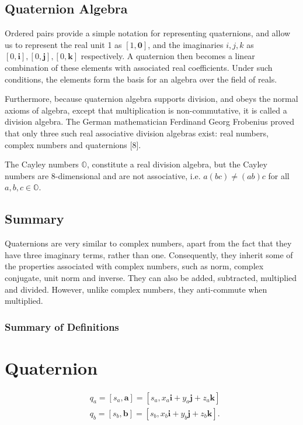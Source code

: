\documentclass[10pt]{article}
\begin{document}
\subsection{Quaternion Algebra}
Ordered pairs provide a simple notation for representing quaternions, and allow us to represent the real unit 1 as $[1, \mathbf{0}]$, and the imaginaries $i, j, k$ as $[0, \mathbf{i}],[0, \mathbf{j}],[0, \mathbf{k}]$ respectively. A quaternion then becomes a linear combination of these elements with associated real coefficients. Under such conditions, the elements form the basis for an algebra over the field of reals.

Furthermore, because quaternion algebra supports division, and obeys the normal axioms of algebra, except that multiplication is non-commutative, it is called a division algebra. The German mathematician Ferdinand Georg Frobenius proved that only three such real associative division algebras exist: real numbers, complex numbers and quaternions [8].

The Cayley numbers $\mathbb{O}$, constitute a real division algebra, but the Cayley numbers are 8-dimensional and are not associative, i.e. $a(b c) \neq(a b) c$ for all $a, b, c \in \mathbb{O}$.

\subsection{Summary}
Quaternions are very similar to complex numbers, apart from the fact that they have three imaginary terms, rather than one. Consequently, they inherit some of the properties associated with complex numbers, such as norm, complex conjugate, unit norm and inverse. They can also be added, subtracted, multiplied and divided. However, unlike complex numbers, they anti-commute when multiplied.

\subsubsection{Summary of Definitions}
\section{Quaternion}
$$
\begin{aligned}
& q_{a}=\left[s_{a}, \mathbf{a}\right]=\left[s_{a}, x_{a} \mathbf{i}+y_{a} \mathbf{j}+z_{a} \mathbf{k}\right] \\
& q_{b}=\left[s_{b}, \mathbf{b}\right]=\left[s_{b}, x_{b} \mathbf{i}+y_{b} \mathbf{j}+z_{b} \mathbf{k}\right] .
\end{aligned}
$$
\end{document}
